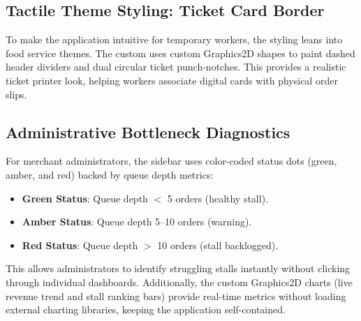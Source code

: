 \subsection{Tactile Theme Styling: Ticket Card Border}
To make the application intuitive for temporary workers, the styling leans into food service themes. 
The custom  uses custom Graphics2D shapes to paint dashed header dividers and dual circular ticket punch-notches. 
This provides a realistic ticket printer look, helping workers associate digital cards with physical order slips.

\subsection{Administrative Bottleneck Diagnostics}
For merchant administrators, the sidebar uses color-coded status dots (green, amber, and red) backed by queue depth metrics:
\begin{itemize}
    \item \textbf{Green Status}: Queue depth $<$ 5 orders (healthy stall).
    \item \textbf{Amber Status}: Queue depth 5--10 orders (warning).
    \item \textbf{Red Status}: Queue depth $>$ 10 orders (stall backlogged).
\end{itemize}
This allows administrators to identify struggling stalls instantly without clicking through individual dashboards. 
Additionally, the custom Graphics2D charts (live revenue trend and stall ranking bars) provide real-time metrics without loading external charting libraries, keeping the application self-contained.

